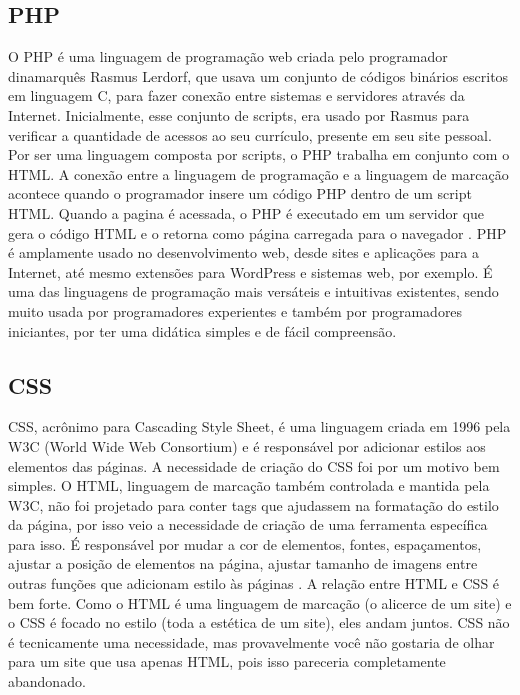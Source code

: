 \subsection{PHP}
O PHP é uma linguagem de programação web criada pelo programador dinamarquês Rasmus Lerdorf, que usava um conjunto de códigos binários escritos em linguagem C, para fazer conexão entre sistemas e servidores através da Internet. Inicialmente, esse conjunto de scripts, era usado por Rasmus para verificar a quantidade de acessos ao seu currículo, presente em seu site pessoal. 
Por ser uma linguagem composta por scripts, o PHP trabalha em conjunto com o HTML. A conexão entre a linguagem de programação e a linguagem de marcação acontece quando o programador insere um código PHP dentro de um script HTML. Quando a pagina é acessada, o PHP é executado em um servidor que gera o código HTML e o retorna como página carregada para o navegador \cite{Andrei2019b}.
PHP é amplamente usado no desenvolvimento web, desde sites e aplicações para a Internet, até mesmo extensões para WordPress e sistemas web, por exemplo. É uma das linguagens de programação mais versáteis e intuitivas existentes, sendo muito usada por programadores experientes e também por programadores iniciantes, por ter uma didática simples e de fácil compreensão.

\subsection{CSS}
CSS, acrônimo para Cascading Style Sheet, é uma linguagem criada em 1996 pela W3C (World Wide Web Consortium) e é responsável por adicionar estilos aos elementos das páginas. A necessidade de criação do CSS foi por um motivo bem simples. O HTML, linguagem de marcação também controlada e mantida pela W3C, não foi projetado para conter tags que ajudassem na formatação do estilo da página, por isso veio a necessidade de criação de uma ferramenta específica para isso. É responsável por mudar a cor de elementos, fontes, espaçamentos, ajustar a posição de elementos na página, ajustar tamanho de imagens entre outras funções que adicionam estilo às páginas \cite{Ariane2019}. 
A relação entre HTML e CSS é bem forte. Como o HTML é uma linguagem de marcação (o alicerce de um site) e o CSS é focado no estilo (toda a estética de um site), eles andam juntos. CSS não é tecnicamente uma necessidade, mas provavelmente você não gostaria de olhar para um site que usa apenas HTML, pois isso pareceria completamente abandonado.
